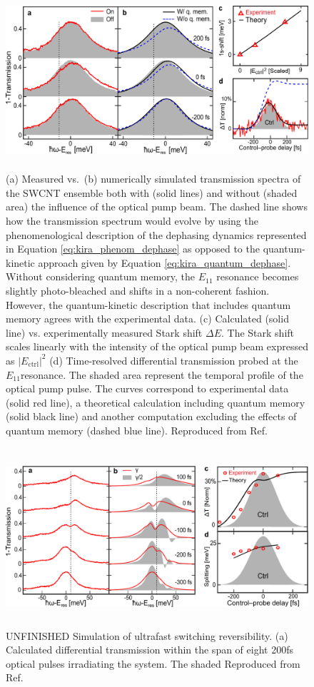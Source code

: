 \begin{figure}[H]
	\centering
	\includegraphics[height=2.6in]{images/chapter_coherent/nonresonant}
	\caption{(a) Measured vs.\ (b) numerically simulated transmission spectra of the SWCNT ensemble both with (solid lines) and without (shaded area) the influence of the optical pump beam. The dashed line shows how the transmission spectrum would evolve by using the phenomenological description of the dephasing dynamics represented in Equation \eqref{eq:kira_phenom_dephase} as opposed to the quantum-kinetic approach given by Equation \eqref{eq:kira_quantum_dephase}. Without considering quantum memory, the $E_{11}$ resonance becomes slightly photo-bleached and shifts in a non-coherent fashion. However, the quantum-kinetic description that includes quantum memory agrees with the experimental data. (c) Calculated (solid line) vs. experimentally measured Stark shift $\Delta E$. The Stark shift scales linearly with the intensity of the optical pump beam expressed as $|E_\text{ctrl}|^2$ (d) Time-resolved differential transmission probed at the $E_{11}$resonance. The shaded area represent the temporal profile of the optical pump pulse. The curves correspond to experimental data (solid red line), a theoretical calculation including quantum memory (solid black line) and another computation excluding the effects of quantum memory (dashed blue line). Reproduced from Ref.\ \cite{mack2019}}
\end{figure}

\begin{figure}[ht]
	\centering
	\includegraphics[height=2.6in]{images/chapter_coherent/resonant}
	\caption{{\color{red}UNFINISHED} Simulation of ultrafast switching reversibility. (a) Calculated differential transmission within the span of eight 200fs optical pulses irradiating the system. The shaded  Reproduced from Ref.\ \cite{mack2019}}
\end{figure}

